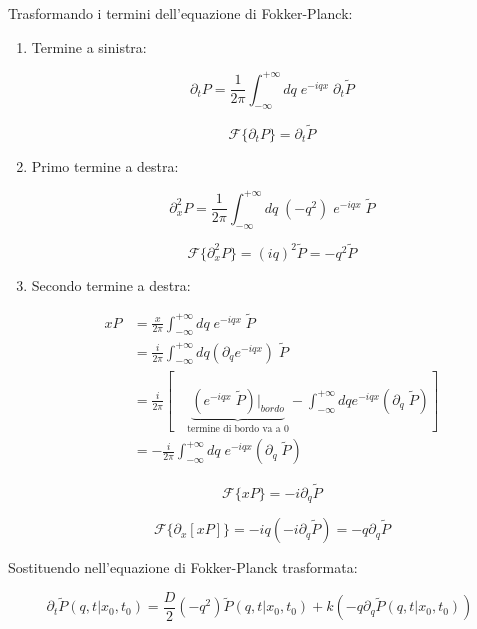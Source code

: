 Trasformando i termini dell'equazione di Fokker-Planck:

\begin{enumerate}
    \item Termine a sinistra:

    \begin{equation}
    \partial_t P = \frac{1}{2\pi} \int_{-\infty}^{+\infty} dq \; e^{-iqx} \; \partial_t \tilde{P}
    \end{equation}

    
    $$
     \mathcal{F}\{\partial_t P\} = \partial_t \tilde{P}
    $$
    
\item  Primo termine a destra:

    \begin{equation}
    \partial_x^2 P = \frac{1}{2\pi} \int_{-\infty}^{+\infty} dq \; (-q^2) \; e^{-iqx} \;\tilde{P}
    \end{equation}
    
    $$
     \mathcal{F}\{\partial_x^2 P\} = (iq)^2 \tilde{P} = -q^2 \tilde{P}
    $$
    
\item  Secondo termine a destra:

    \begin{align}
    xP &= \frac{x}{2\pi} \int_{-\infty}^{+\infty} dq \; e^{-iqx} \;\tilde{P} \nonumber \\ &= \frac{i}{2\pi} \int_{-\infty}^{+\infty} dq \left( \partial_q e^{-iqx} \right)\;\tilde{P} \nonumber \\ &= \frac{i}{2\pi} \left[ \quad \underbrace{(e^{-iqx}  \;\tilde{P} )|_{bordo}}_{\text{termine di bordo va a 0}}- \int_{-\infty}^{+\infty} dq  e^{-iqx}  \left( \partial_q \;\tilde{P} \right) \right] \nonumber \\ &= - \frac{i}{2\pi}\int_{-\infty}^{+\infty} dq  \; e^{-iqx}  \left( \partial_q \;\tilde{P} \right)
    \end{align}

    
    $$
     \mathcal{F}\{xP\} = -i \partial_q \tilde{P}
    $$
    
    $$
    \mathcal{F}\{\partial_x [xP]\} = -iq (-i \partial_q \tilde{P}) =- q \partial_q \tilde{P} 
    $$
    
\end{enumerate} 

Sostituendo nell'equazione di Fokker-Planck trasformata:

\begin{equation}
\partial_t \tilde{P}(q,t|x_0,t_0) = \frac{D}{2}(-q^2)\tilde{P}(q,t|x_0,t_0) + k(-q \partial_q \tilde{P}(q,t|x_0,t_0))
\end{equation}

